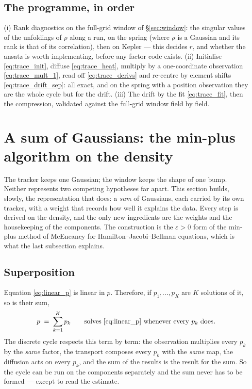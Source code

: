 \documentclass[11pt,a4paper]{article}
\newcommand{\eps}{\varepsilon}
\theoremstyle{plain}
\theoremstyle{definition}
\theoremstyle{remark}
\begin{document}
\subsection{The programme, in order}
(i) Rank diagnostics on the full-grid window of \S\ref{sec:window}: the singular values of the unfoldings of $\rho$ along a run, on the spring (where $\rho$ is a Gaussian and its rank is that of its correlation), then on Kepler --- this decides $r$, and whether the ansatz is worth implementing, before any factor code exists. (ii) Initialise \eqref{eq:trace_init}, diffuse \eqref{eq:trace_heat}, multiply by a one-coordinate observation \eqref{eq:trace_mult_1}, read off \eqref{eq:trace_derivs} and re-centre by element shifts \eqref{eq:trace_drift_sep}: all exact, and on the spring with a position observation they are the whole cycle but for the drift. (iii) The drift by the fit \eqref{eq:trace_fit}, then the compression, validated against the full-grid window field by field.

\section{A sum of Gaussians: the min-plus algorithm on the density}
\label{sec:sum}

The tracker keeps one Gaussian; the window keeps the shape of one bump. Neither represents two competing hypotheses far apart. This section builds, slowly, the representation that does: a \emph{sum} of Gaussians, each carried by its own tracker, with a weight that records how well it explains the data. Every step is derived on the density, and the only new ingredients are the weights and the housekeeping of the components. The construction is the $\eps>0$ form of the min-plus method of McEneaney for Hamilton--Jacobi--Bellman equations, which is what the last subsection explains.

\subsection{Superposition}

Equation \eqref{eq:linear_p} is linear in $p$. Therefore, if $p_1,\dots,p_K$ are $K$ solutions of it, so is their sum,
\begin{equation}
  p \;=\; \sum_{k=1}^Kp_k \qquad\text{solves \eqref{eq:linear_p} whenever every } p_k \text{ does.}
  \label{eq:sum_super}
\end{equation}
The discrete cycle respects this term by term: the observation multiplies every $p_k$ by the \emph{same} factor, the transport composes every $p_k$ with the \emph{same} map, the diffusion acts on every $p_k$, and the sum of the results is the result for the sum. So the cycle can be run on the components separately and the sum never has to be formed --- except to read the estimate.
\end{document}

